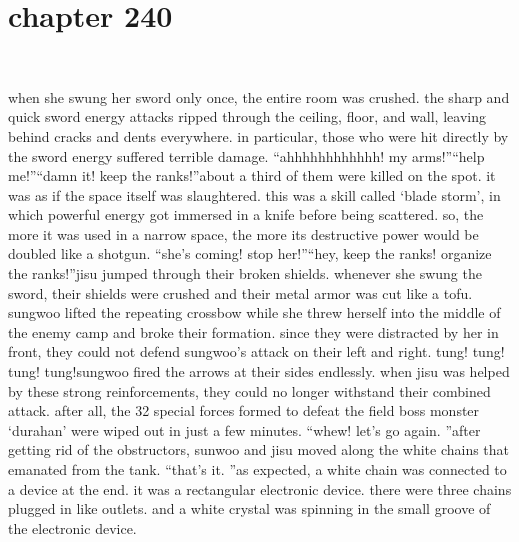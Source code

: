 \section{chapter 240}

                             




when she swung her sword only once, the entire room was crushed.
 the sharp and quick sword energy attacks ripped through the ceiling, floor, and wall, leaving behind cracks and dents everywhere.
in particular, those who were hit directly by the sword energy suffered terrible damage.
“ahhhhhhhhhhhh! my arms!”“help me!”“damn it! keep the ranks!”about a third of them were killed on the spot.
 it was as if the space itself was slaughtered.
this was a skill called ‘blade storm’, in which powerful energy got immersed in a knife before being scattered.
 so, the more it was used in a narrow space, the more its destructive power would be doubled like a shotgun.
“she’s coming! stop her!”“hey, keep the ranks! organize the ranks!”jisu jumped through their broken shields.
whenever she swung the sword, their shields were crushed and their metal armor was cut like a tofu.
sungwoo lifted the repeating crossbow while she threw herself into the middle of the enemy camp and broke their formation.
 since they were distracted by her in front, they could not defend sungwoo’s attack on their left and right.
tung! tung! tung! tung!sungwoo fired the arrows at their sides endlessly.
 when jisu was helped by these strong reinforcements, they could no longer withstand their combined attack.
after all, the 32 special forces formed to defeat the field boss monster ‘durahan’ were wiped out in just a few minutes.
“whew! let’s go again.
”after getting rid of the obstructors, sunwoo and jisu moved along the white chains that emanated from the tank.
“that’s it.
”as expected, a white chain was connected to a device at the end.
it was a rectangular electronic device.
 there were three chains plugged in like outlets.
and a white crystal was spinning in the small groove of the electronic device.


